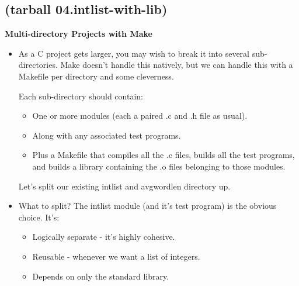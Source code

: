 \documentclass[handout]{beamer}
\newcommand\myheading[1]{%
  \par\bigskip
  {\Large\bfseries#1}\par\smallskip}
\begin{document}
\subsection{(tarball 04.intlist-with-lib)}

\begin{frame}[fragile]
\myheading{Multi-directory Projects with Make}
\begin{itemize}
  \item
  As a C project gets larger, you may wish to break it into several
  sub-directories.  Make doesn't handle this natively, but we can
  handle this with a \alert{Makefile} per directory and some cleverness.

  \pitem
  Each sub-directory should contain:
  \begin{itemize}
    \item
    One or more \alert{modules} (each a paired .c and .h file as usual).
    \item
    Along with any associated test programs.
    \item
    Plus a Makefile that compiles all the .c files, builds all the test
    programs, and builds a \alert{library} containing the \alert{.o}
    files belonging to those modules.
  \end{itemize}

  \pitem
  Let's split our existing intlist and avgwordlen directory up.

  \item
  What to split?
  \pause
  The intlist module (and it's test program) is the obvious choice.  It's:

    \begin{itemize}
    \item
    Logically separate - it's \alert{highly cohesive}.
    \item
    Reusable - whenever we want a list of integers.
    \item
    Depends on only the standard library.
    \end{itemize}

\end{itemize}
\end{frame}
\end{document}
